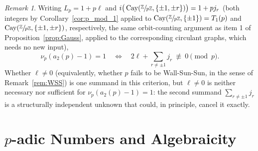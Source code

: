 \documentclass{article}
\theoremstyle{plain}
\theoremstyle{definition}
\newtheorem{openquestion}[theorem]{Open Question}
\theoremstyle{remark}
\newtheorem{remark}[theorem]{Remark}
\newcommand{\Z}{\mathbb{Z}}
\newcommand{\F}{\mathbb{F}}
\newcommand{\quot}[2]{\sfrac{#1}{#2}}
\DeclareMathOperator{\Cay}{Cay}
\begin{document}

\begin{remark}
Writing $L_p=1+p\ell$ and $i\big(\Cay(\sfrac{\Z}{p\Z},\{\pm1,\pm r\})\big)=1+pj_r$ (both integers by Corollary~\ref{cor:p_mod_1} applied to $\Cay(\sfrac{\Z}{p\Z},\{\pm1\})=T_1(p)$ and $\Cay(\sfrac{\Z}{p\Z},\{\pm1,\pm r\})$, respectively, the same orbit-counting argument as item 1 of Proposition~\ref{prop:Gauss}, applied to the corresponding circulant graphs, which needs no new input),
\[
\nu_p(a_2(p)-1)=1\quad\Longleftrightarrow\quad 2\ell+\sum_{r\ne\pm1}j_r\ \not\equiv\ 0\pmod p.
\]
Whether $\ell\ne0$ (equivalently, whether $p$ fails to be Wall-Sun-Sun, in the sense of Remark~\ref{rem:WSS}) is one summand in this criterion, but $\ell\ne0$ is neither necessary nor sufficient for $\nu_p(a_2(p)-1)=1$: the second summand $\sum_{r \neq \pm 1} j_r$ is a structurally independent unknown that could, in principle, cancel it exactly.
\end{remark}



\section{$p$-adic Numbers and Algebraicity}\label{sec:padic}
\end{document}
